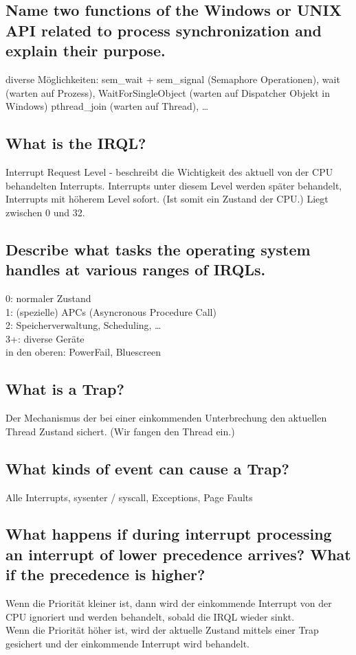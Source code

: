\subsection{Name two functions of the Windows or UNIX API related to process synchronization and explain their purpose.}
diverse Möglichkeiten: sem\_wait + sem\_signal (Semaphore Operationen), wait (warten auf Prozess), WaitForSingleObject (warten auf Dispatcher Objekt in Windows) pthread\_join (warten auf Thread), \dots

\subsection{What is the IRQL?}
Interrupt Request Level - beschreibt die Wichtigkeit des aktuell von der CPU behandelten Interrupts.
Interrupts unter diesem Level werden später behandelt, Interrupts mit höherem Level sofort.
(Ist somit ein Zustand der CPU.)
Liegt zwischen 0 und 32.

\subsection{Describe what tasks the operating system handles at various ranges of IRQLs.}
0: normaler Zustand\\
1: (spezielle) APCs (Asyncronous Procedure Call)\\
2: Speicherverwaltung, Scheduling, \dots\\
3+: diverse Geräte\\
in den oberen: PowerFail, Bluescreen

\subsection{What is a Trap?}
Der Mechanismus der bei einer einkommenden Unterbrechung den aktuellen Thread Zustand sichert.
(Wir fangen den Thread ein.)

\subsection{What kinds of event can cause a Trap?}
Alle Interrupts, sysenter / syscall, Exceptions, Page Faults

\subsection{What happens if during interrupt processing an interrupt of lower precedence arrives? What if the precedence is higher?}
Wenn die Priorität kleiner ist, dann wird der einkommende Interrupt von der CPU ignoriert und werden behandelt, sobald die IRQL wieder sinkt.\\
Wenn die Priorität höher ist, wird der aktuelle Zustand mittels einer Trap gesichert und der einkommende Interrupt wird behandelt.

